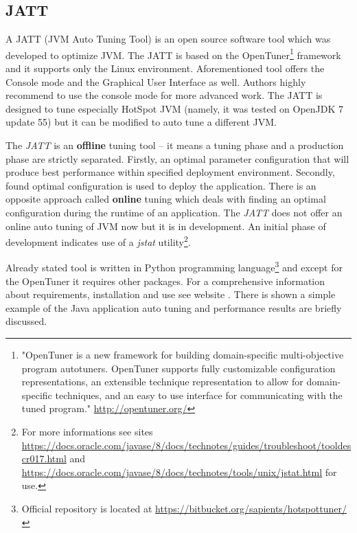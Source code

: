 \documentclass[
  digital, %
  oneside,
  notable, %
  nolof,     %
  nolot     %
]{fithesis3}
\begin{document}
\subsection{JATT}
A JATT (JVM Auto Tuning Tool) is an open source software tool which was developed to optimize JVM. The JATT is based on the OpenTuner\footnote{"OpenTuner is a new framework for building domain-specific multi-objective program autotuners. OpenTuner supports fully customizable configuration representations, an extensible technique representation to allow for domain-specific techniques, and an easy to use interface for communicating with the tuned program." \url{http://opentuner.org/}} framework and it supports only the Linux environment. Aforementioned tool offers the Console mode and the Graphical User Interface as well. Authors highly recommend to use the console mode for more advanced work. The JATT is designed to tune especially HotSpot JVM (namely, it was tested on OpenJDK 7 update 55) but it can be modified to auto tune a different JVM.
\cite{jatt-web} \cite{jatt-web-dzone}

The \textit{JATT} is an \textbf{offline} tuning tool -- it means a tuning phase and a production phase are strictly separated. Firstly, an optimal parameter configuration that will produce best performance within specified deployment environment. Secondly, found optimal configuration is used to deploy the application. There is an opposite approach called \textbf{online} tuning which deals with finding an optimal configuration during the runtime of an application. The \textit{JATT} does not offer an online auto tuning of JVM now but it is in development. 
An initial phase of development indicates use of a \textit{jstat} utility\footnote{For more informations see sites \url{https://docs.oracle.com/javase/8/docs/technotes/guides/troubleshoot/tooldescr017.html} and \url{https://docs.oracle.com/javase/8/docs/technotes/tools/unix/jstat.html} for use.}. \cite{jatt}

Already stated tool is written in Python programming language\footnote{Official repository is located at \url{https://bitbucket.org/sapients/hotspottuner/}} and except for the OpenTuner it requires other packages. For a comprehensive information about requirements, installation and use see website \cite{jatt-web-medium}. There is shown a simple example of the Java application auto tuning and performance results are briefly discussed.
\end{document}
